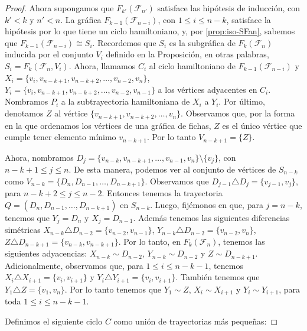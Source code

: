 \begin{proof}
    Ahora supongamos que $F_{k'}(\mathcal{F}_{n'})$ satisface las hip\'otesis de
    inducci\'on, con $k'< k$ y $n'<n$. La gr\'afica
    $F_{k-1}(\mathcal{F}_{n-i})$, con $1 \leq i \leq n-k$, satisface la
    hip\'otesis por lo que tiene un ciclo hamiltoniano, y, por
    \cref{prop:iso-SFan}, sabemos que $F_{k-1}(\mathcal{F}_{n-i}) \cong S_i$.
    Recordemos que  $S_i$ es la subgr\'afica de $F_k(\mathcal{F}_n)$ inducida
    por el conjunto $V_i$ definido en la Proposici\'on, en otras palabras, $S_i=
    F_k(\mathcal{F}_n, V_i)$. Ahora, llamamos $C_i$ al ciclo hamiltoniano de
    $F_{k-1}(\mathcal{F}_{n-i})$ y $X_i = \{v_i, v_{n-k+1}, v_{n-k+2}, \dots,
    v_{n-2}, v_n\}$, $Y_i= \{v_i, v_{n-k+1}, v_{n-k+2}, \dots, v_{n-2},
    v_{n-1}\}$ a los v\'ertices adyacentes en $C_i$. Nombramos $P_i$ a la
    subtrayectoria hamiltoniana de $X_i$ a $Y_i$. Por \'ultimo, denotamos $Z$ al
    v\'ertice $\{v_{n-k+1}, v_{n-k+2}, \dots, v_n\}$. Observamos que, por la
    forma en la que ordenamos los v\'ertices de una gr\'afica de fichas, $Z$ es
    el \'unico v\'ertice que cumple tener elemento m\'inimo $v_{n-k+1}$. Por lo
    tanto  $V_{n-k+1} = \{Z\}$. 
    
    Ahora, nombramos $D_j =\{v_{n-k}, v_{n-k+1}, \dots, v_{n-1}, v_n\} \setminus
    \{v_j\}$, con $n-k+1 \leq j \leq n$.  De esta manera, podemos ver al
    conjunto de v\'ertices de $S_{n-k}$ como $V_{n-k}=\{D_n, D_{n-1}, \dots,
    D_{n-k+1}\}$. Observamos que $D_{j-1} \triangle D_j= \{v_{j-1}, v_j\}$, para
    $n-k+2 \leq j \leq n-2$. Entonces tenemos la trayectoria $Q= (D_n, D_{n-1},
    \dots, D_{n-k+1})$ en $S_{n-k}$.     
    Luego, fij\'emonos en que, para $j= n-k$, tenemos que $Y_j = D_n$ y $X_j=
    D_{n-1}$. Adem\'as tenemos las siguientes diferencias sim\'etricas
    $X_{n-k}\triangle D_{n-2} =\{v_{n-2}, v_{n-1}\}$, $Y_{n-k}\triangle D_{n-2}
    =\{v_{n-2}, v_n\}$, $Z\triangle D_{n-k+1} =\{v_{n-k}, v_{n-k+1}\}$. Por lo
    tanto, en $F_k(\mathcal{F}_n)$, tenemos las siguientes adyacencias: $X_{n-k}
    \sim D_{n-2}$, $Y_{n-k} \sim D_{n-2}$ y $Z \sim D_{n-k+1}$. Adicionalmente,
    observamos que, para $1 \leq i \leq n- k- 1$, tenemos $X_{i} \triangle
    X_{i+1}= \{v_i, v_{i+1}\}$ y $Y_i \triangle Y_{i+1} = \{v_i, v_{i+1}\}$.
    Tambi\'en tenemos que $Y_1 \triangle Z = \{v_1, v_n\}$. Por lo tanto tenemos
    que $Y_1 \sim Z$, $X_i \sim X_{i+1}$ y $Y_i \sim Y_{i+1}$, para toda $1 \leq
    i \leq n-k-1$.
            
    Definimos el siguiente ciclo $C$ como uni\'on de trayectorias m\'as
    peque\~{n}as: 
    

\end{proof}
